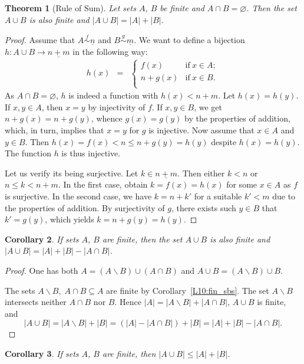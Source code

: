 \documentclass[12pt,notitlepage]{article}
\theoremstyle{plain}
\newtheorem{thm}{Theorem}[section]
\newtheorem{corr}[thm]{Corollary}
\theoremstyle{definition}
\theoremstyle{plain}
\newcommand{\sbs}{\subseteq}
\renewcommand{\setminus}{\smallsetminus}
\newcommand{\void}{\varnothing}
\newcommand{\ul}[1]{\underline{#1}}
\newcommand{\1}{\mathbf{1}}
\newcommand{\0}{\mathbf{0}}
\begin{document}
\begin{thm}[Rule of Sum]\label{L10:set_sum}
Let sets $A$, $B$ be finite and $A \cap B = \void$. Then the set $A \cup B$ is also finite and $|A \cup B| = |A| + |B|$.
\end{thm}
\begin{proof}
Assume that $A \stackrel{f}{\sim} \ul{n}$ and $B \stackrel{g}{\sim} \ul{m}$. We want to define a bijection $h\colon A \cup B \to \ul{n + m}$ in the following way:
$$
\begin{array}{rcll}
h(x) &=& \begin{cases}
		f(x)&\mbox{if}\ x \in A;\\
		n + g(x)&\mbox{if}\ x \in B.\\
		\end{cases}
\end{array}
$$
As $A \cap B = \void$, $h$ is indeed a function with $h(x) < n + m$. Let $h(x) = h(y)$. If $x, y \in A$, then $x = y$ by injectivity of $f$. If $x, y \in B$, we get $n + g(x) = n + g(y)$, whence $g(x) = g(y)$ by the properties of addition, which, in turn, implies that $x = y$ for $g$ is injective. Now assume that $x \in A$ and $y \in B$. Then $h(x) = f(x) < n \leq n + g(y) = h(y)$ despite $h(x) = h(y)$. The function $h$ is thus injective.

Let us verify its being surjective. Let $k \in \ul{n + m}$. Then either $k < n$ or $n \leq k < n + m$. In the first case, obtain $k = f(x) = h(x)$ for some $x \in A$ as $f$ is surjective. In the second case, we have $k = n + k'$ for a suitable $k' < m$ due to the properties of addition. By surjectivity of $g$, there exists such $y \in B$ that $k' = g(y)$, which yields $k = n + g(y) = h(y)$.
\end{proof}

\begin{corr}\label{L10:in-ex}
If sets $A$, $B$ are finite, then the set $A \cup B$ is also finite and
$|A \cup B| = |A| + |B| - |A \cap B|$.
\end{corr}
\begin{proof}
One has both $A = (A\setminus B) \cup (A \cap B)$ and $A \cup B = (A\setminus B) \cup B$.

The sets $A \setminus B,\; A \cap B \sbs A$ are finite by Corollary~\ref{L10:fin_sbs}. The set $A \setminus B$ intersects neither $A \cap B$ nor $B$. Hence $|A| = |A\setminus B| + |A \cap B|$, $A \cup B$ is finite, and
$$
|A \cup B| = |A\setminus B| + |B| = (|A| - |A \cap B|) + |B| = |A| + |B| - |A \cap B|.
$$
\end{proof}
\begin{corr}\label{L10:fin-union}
If sets $A$, $B$ are finite, then $|A \cup B| \leq |A| + |B|$.
\end{corr}
\end{document}
